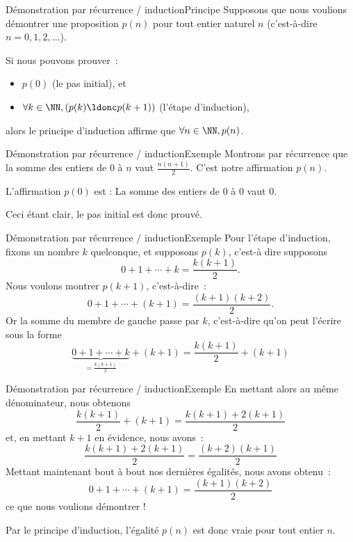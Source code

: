 \documentclass[french,xcolor=svgnames]{beamer}
\begin{document}
\begin{frame}{Démonstration par récurrence / induction}{Principe}
  Supposons que nous voulions démontrer une proposition \(p(n)\) pour tout entier naturel \(n\)\pause{} (c'est-à-dire \(n = 0, 1, 2, \ldots\)).\pause{}

  Si nous pouvons prouver~:\pause{}
  \begin{itemize}[<+->]
  \item \(p(0)\) (\og le pas initial\fg{}), et
  \item \(\forall k\in \NN, (p(k) \ldonc p(k+1))\) (\og l'étape d'induction\fg{}),
  \end{itemize}\pause{}
  alors le principe d'induction affirme que \(\forall n\in \NN, p(n)\).
\end{frame}
\begin{frame}{Démonstration par récurrence / induction}{Exemple}
  Montrons par récurrence que la somme des entiers de \(0\) à \(n\) vaut \(\frac{n(n+1)}{2}\). C'est notre affirmation \(p(n)\).

  L'affirmation \(p(0)\) est : \og La somme des entiers de \(0\) à \(0\) vaut \(0\).\fg{} \pause

  Ceci étant clair, le pas initial est donc prouvé.\pause
\end{frame}
\begin{frame}{Démonstration par récurrence / induction}{Exemple}
  Pour l'étape d'induction, fixons un nombre \(k\) quelconque, et supposons \(p(k)\), c'est-à dire supposons\pause
  \begin{equation*}
    0 + 1 + \cdots + k = \frac{k(k+1)}{2}.
  \end{equation*}\pause
  Nous voulons montrer \(p(k+1)\), c'est-à-dire~:
  \begin{equation*}
    0 + 1 + \cdots + (k+1) = \frac{(k+1)(k+2)}{2}.
  \end{equation*}\pause
  Or la somme du membre de gauche \og passe\fg{} par \(k\), c'est-à-dire qu'on peut l'écrire sous la forme
  \begin{equation*}
    \underbrace{0 + 1 + \cdots + k}_{= \frac{k(k+1)}{2}} + (k+1) = \frac{k(k+1)}{2} + (k+1)
  \end{equation*}\pause
\end{frame}
\begin{frame}{Démonstration par récurrence / induction}{Exemple}
  En mettant alors au même dénominateur, nous obtenons
  \begin{equation*}
    \frac{k(k+1)}{2} + (k+1) = \frac{k(k+1)+2(k+1)}{2}
  \end{equation*}\pause
  et, en mettant \(k+1\) en évidence, nous avons~:
  \begin{equation*}
    \frac{k(k+1)+2(k+1)}{2} = 
    \frac{(k+2)(k+1)}{2}
  \end{equation*}\pause
  Mettant maintenant bout à bout nos dernières égalités, nous avons obtenu~:
  \begin{equation*}
    0 + 1 + \cdots + (k+1) = \frac{(k+1)(k+2)}{2}
  \end{equation*}
  ce que nous voulions démontrer !\pause

  Par le principe d'induction, l'égalité \(p(n)\) est donc vraie pour tout entier \(n\).
\end{frame}
\end{document}
